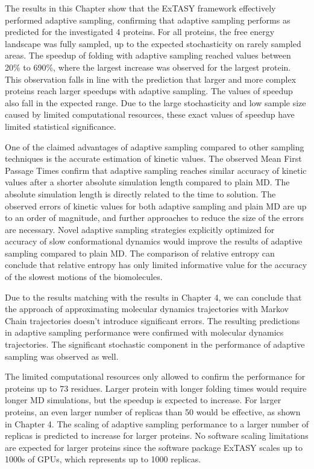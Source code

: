 The results in this Chapter show that the ExTASY framework \cite{Extasy2019} effectively
performed adaptive sampling, confirming that adaptive sampling performs as predicted for the investigated 4 proteins. 
For all proteins, the free energy landscape was fully sampled, up to the expected stochasticity on rarely sampled areas. The speedup of folding with adaptive sampling reached values between 20\% to 690\%, where the largest increase was observed for the largest protein. This observation falls in line with the prediction that larger and more complex proteins reach larger speedups with adaptive sampling. The values of speedup also fall in the expected range. Due to the large stochasticity and low sample size caused by limited computational resources, these exact values of speedup have limited statistical significance. 

One of the claimed advantages of adaptive sampling compared to other sampling techniques is the accurate estimation of kinetic values. The observed Mean First Passage Times confirm that adaptive sampling reaches similar accuracy of kinetic values after a shorter absolute simulation length compared to plain MD. The absolute simulation length is directly related to the time to solution. The observed errors of kinetic values for both adaptive sampling and plain MD are up to an order of magnitude, and further approaches to reduce the size of the errors are necessary. Novel adaptive sampling strategies explicitly optimized for accuracy of slow conformational dynamics would improve the results of adaptive sampling compared to plain MD. The comparison of relative entropy can conclude that relative entropy has only limited informative value for the accuracy of the slowest motions of the biomolecules.  

Due to the results matching with the results in Chapter 4, we can conclude that the approach of approximating molecular dynamics trajectories with Markov Chain trajectories doesn't introduce significant errors. The resulting predictions in adaptive sampling performance were confirmed with molecular dynamics trajectories. The significant stochastic component in the performance of adaptive sampling was observed as well.


The limited computational resources only allowed to confirm the performance for proteins up to 73 residues. Larger protein with longer folding times would require longer MD simulations, but the speedup is expected to increase. For larger proteins, an even larger number of replicas than 50 would be effective, as shown in Chapter 4. The scaling of adaptive sampling performance to a larger number of replicas is predicted to increase for larger proteins. No software scaling limitations are expected for larger proteins since the software package ExTASY scales up to 1000s of GPUs, which represents up to 1000 replicas.